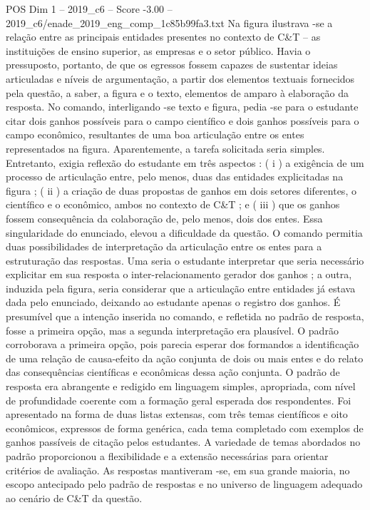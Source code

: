 \begin{textsample}{POS Dim 1 – 2019\_c6 – Score -3.00 – 2019\_c6/enade\_2019\_eng\_comp\_1c85b99fa3.txt}
Na figura ilustrava -se a relação entre as principais entidades presentes no contexto de C\&T – as instituições de ensino superior, as empresas e o setor público.
Havia o pressuposto, portanto, de que os egressos fossem capazes de sustentar ideias articuladas e níveis de argumentação, a partir dos elementos textuais fornecidos pela questão, a saber, a figura e o texto, elementos de amparo à elaboração da resposta.
No comando, interligando -se texto e figura, pedia -se para o estudante citar dois ganhos possíveis para o campo científico e dois ganhos possíveis para o campo econômico, resultantes de uma boa articulação entre os entes representados na figura.
Aparentemente, a tarefa solicitada seria simples.
Entretanto, exigia reflexão do estudante em três aspectos : ( i ) a exigência de um processo de articulação entre, pelo menos, duas das entidades explicitadas na figura ; ( ii ) a criação de duas propostas de ganhos em dois setores diferentes, o científico e o econômico, ambos no contexto de C\&T ; e ( iii ) que os ganhos fossem consequência da colaboração de, pelo menos, dois dos entes.
Essa singularidade do enunciado, elevou a dificuldade da questão.
O comando permitia duas possibilidades de interpretação da articulação entre os entes para a estruturação das respostas.
Uma seria o estudante interpretar que seria necessário explicitar em sua resposta o inter-relacionamento gerador dos ganhos ; a outra, induzida pela figura, seria considerar que a articulação entre entidades já estava dada pelo enunciado, deixando ao estudante apenas o registro dos ganhos.
É presumível que a intenção inserida no comando, e refletida no padrão de resposta, fosse a primeira opção, mas a segunda interpretação era plausível.
O padrão corroborava a primeira opção, pois parecia esperar dos formandos a identificação de uma relação de causa-efeito da ação conjunta de dois ou mais entes e do relato das consequências científicas e econômicas dessa ação conjunta.
O padrão de resposta era abrangente e redigido em linguagem simples, apropriada, com nível de profundidade coerente com a formação geral esperada dos respondentes.
Foi apresentado na forma de duas listas extensas, com três temas científicos e oito econômicos, expressos de forma genérica, cada tema completado com exemplos de ganhos passíveis de citação pelos estudantes.
A variedade de temas abordados no padrão proporcionou a flexibilidade e a extensão necessárias para orientar critérios de avaliação.
As respostas mantiveram -se, em sua grande maioria, no escopo antecipado pelo padrão de respostas e no universo de linguagem adequado ao cenário de C\&T da questão.

\end{textsample}
